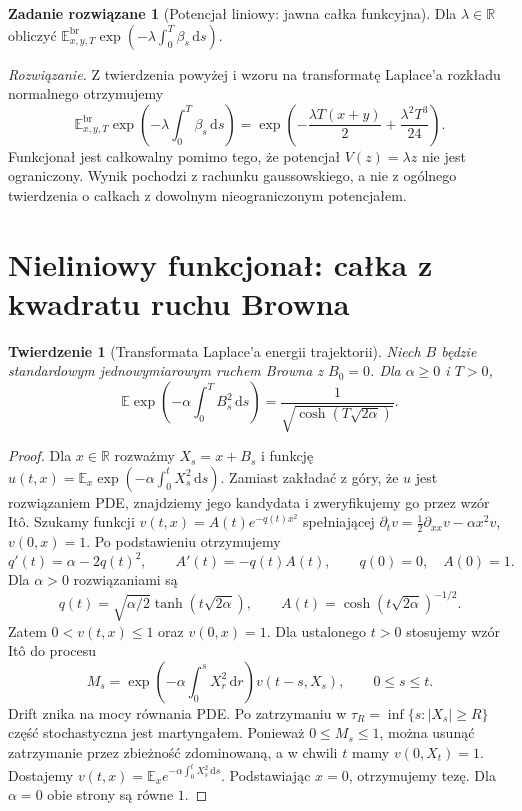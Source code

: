 \documentclass[11pt,a4paper,oneside]{report}
\numberwithin{equation}{chapter}
\theoremstyle{plain}
\newtheorem{twierdzenie}{Twierdzenie}[chapter]
\theoremstyle{definition}
\newtheorem{zadanie}{Zadanie rozwiązane}[chapter]
\theoremstyle{remark}
\newcommand{\R}{\mathbb{R}}
\newcommand{\E}{\mathbb{E}}
\newcommand{\dd}{\mathrm{d}}
\begin{document}
\begin{zadanie}[Potencjał liniowy: jawna całka funkcyjna]
Dla $\lambda\in\R$ obliczyć
$\E_{x,y,T}^{\mathrm{br}}
\exp(-\lambda\int_0^T\beta_s\,\dd s)$.

\emph{Rozwiązanie.} Z twierdzenia powyżej i wzoru na
transformatę Laplace'a rozkładu normalnego otrzymujemy
\[
 \E_{x,y,T}^{\mathrm{br}}
  \exp\!\left(-\lambda\int_0^T\beta_s\,\dd s\right)
 =\exp\left(-\frac{\lambda T(x+y)}2
           +\frac{\lambda^2T^3}{24}\right).
\]
Funkcjonał jest całkowalny pomimo tego, że potencjał
$V(z)=\lambda z$ nie jest ograniczony. Wynik pochodzi
z rachunku gaussowskiego, a nie z ogólnego twierdzenia
o całkach z dowolnym nieograniczonym potencjałem.
\end{zadanie}


\section{Nieliniowy funkcjonał: całka z kwadratu ruchu Browna}\label{sec:volIII:15:05}

\begin{twierdzenie}[Transformata Laplace'a energii trajektorii]\label{thm:volIII:15:05}
\label{th:brownian-square-laplace}
Niech $B$ będzie standardowym jednowymiarowym
ruchem Browna z $B_0=0$. Dla $\alpha\ge0$ i $T>0$,
\[
 \E\exp\left(-\alpha\int_0^T B_s^2\,\dd s\right)
 =\frac1{\sqrt{\cosh(T\sqrt{2\alpha})}}.
\tag{15.7}\label{eq:brownian-square-laplace}
\]
\end{twierdzenie}
\begin{proof}
Dla $x\in\R$ rozważmy $X_s=x+B_s$ i funkcję
$u(t,x)=\E_x\exp(-\alpha\int_0^tX_s^2\,\dd s)$.
Zamiast zakładać z góry, że $u$ jest rozwiązaniem PDE,
znajdziemy jego kandydata i zweryfikujemy go przez
wzór Itô. Szukamy funkcji $v(t,x)=A(t)e^{-q(t)x^2}$
spełniającej
$\partial_tv=\tfrac12\partial_{xx}v-\alpha x^2v$,
$v(0,x)=1$. Po podstawieniu otrzymujemy
\[
 q'(t)=\alpha-2q(t)^2,\qquad
 A'(t)=-q(t)A(t),\qquad q(0)=0,\quad A(0)=1.
\]
Dla $\alpha>0$ rozwiązaniami są
\[
 q(t)=\sqrt{\alpha/2}\tanh(t\sqrt{2\alpha}),\qquad
 A(t)=\cosh(t\sqrt{2\alpha})^{-1/2}.
\]
Zatem $0<v(t,x)\le1$ oraz $v(0,x)=1$.
Dla ustalonego $t>0$ stosujemy wzór Itô do procesu
\[
 M_s=\exp\left(-\alpha\int_0^sX_r^2\,\dd r\right)
 v(t-s,X_s),\qquad 0\le s\le t.
\]
Drift znika na mocy równania PDE. Po zatrzymaniu w
$\tau_R=\inf\{s:|X_s|\ge R\}$ część stochastyczna
jest martyngałem. Ponieważ $0\le M_s\le1$, można
usunąć zatrzymanie przez zbieżność zdominowaną,
a w chwili $t$ mamy $v(0,X_t)=1$. Dostajemy
$v(t,x)=\E_xe^{-\alpha\int_0^tX_s^2\,\dd s}$.
Podstawiając $x=0$, otrzymujemy tezę. Dla
$\alpha=0$ obie strony są równe $1$.
\end{proof}
\end{document}
